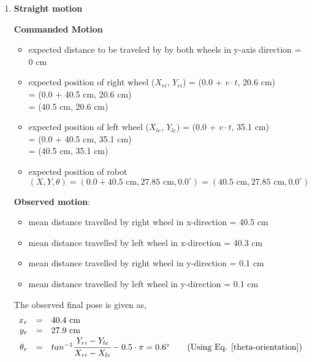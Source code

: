 \begin{enumerate}
\item \textbf{Straight motion}

	\textbf{Commanded Motion}

	\begin{itemize}

		\item expected distance to be traveled by by both wheels in y-axis direction = $0$ cm
	
		\item expected position of right wheel ($X_{ri}$, $Y_{ri}$) = (0.0 + $v\cdot t$, 20.6 cm) \\
			   = (0.0 + 40.5 cm, 20.6 cm)\\
			 = (40.5 cm, 20.6 cm)
	
		\item expected position of left wheel ($X_{le}$, $Y_{le}$) = (0.0 + $v\cdot t$, 35.1 cm) \\
		= (0.0 + 40.5 cm, 35.1 cm)\\
		= (40.5 cm, 35.1 cm)
	
		\item expected position of robot $(X, Y, \theta) = (0.0 + 40.5 \text{ cm}, 27.85 \text{ cm}, 0.0^{\circ}) = (40.5 \text{ cm}, 27.85 \text{ cm}, 0.0^{\circ})$
\end{itemize}
	
\textbf{Observed motion}:
\begin{itemize}
\item mean distance travelled by right wheel in x-direction = 40.5 cm
\item mean distance travelled by left wheel in x-direction = 40.3 cm 
\item mean distance travelled by right wheel in y-direction = 0.1 cm 
\item mean distance travelled by left wheel in y-direction = 0.1 cm 
\end{itemize}

The observed final pose is given as,
\begin{equation}
\begin{array}{rcl}
x_r &=& 40.4 \text{ cm} \\
y_r &=& 27.9 \text{ cm} \\
\theta_r &=& tan^{-1}\cfrac{Y_{ri} - Y_{le}}{X_{ri} - X_{le}} - 0.5\cdot{\pi} = 0.6^{\circ} \qquad \text{(Using Eq. \ref{theta-orientation})}
\end{array}
\end{equation}
	

\end{enumerate}
